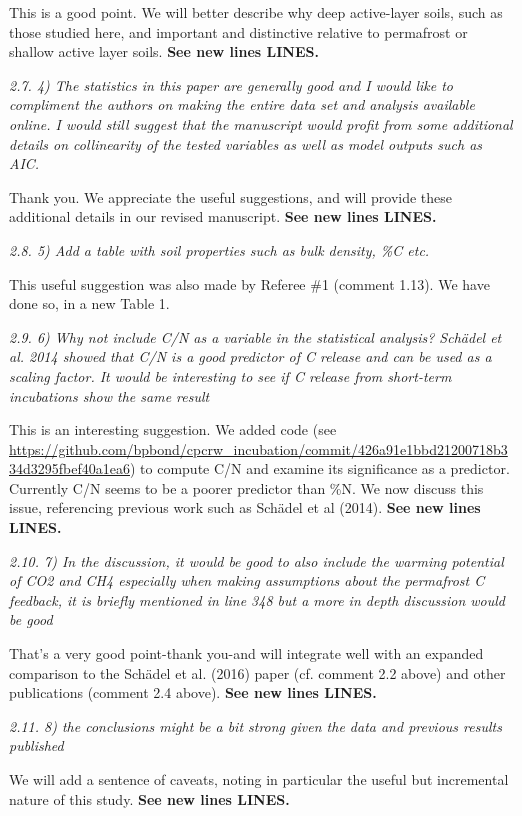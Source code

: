 \documentclass[11pt, oneside]{article}
\begin{document}
This is a good point. We will better describe why deep active-layer soils, such as those studied here, and important and distinctive relative to permafrost or shallow active layer soils.  {\bf See new lines LINES.}

\medskip
{\it 2.7. 4) The statistics in this paper are generally good and I would like to compliment the authors on making the entire data set and analysis available online. I would still suggest that the manuscript would profit from some additional details on collinearity of the tested variables as well as model outputs such as AIC. }

Thank you. We appreciate the useful suggestions, and will provide these additional details in our revised manuscript. {\bf See new lines LINES.}

\medskip
{\it 2.8. 5) Add a table with soil properties such as bulk density, \%C etc. }

This useful suggestion was also made by Referee \#1 (comment 1.13). We have done so, in a new Table 1.

\medskip
{\it 2.9. 6) Why not include C/N as a variable in the statistical analysis? Schädel et al. 2014 showed that C/N is a good predictor of C release and can be used as a scaling factor. It would be interesting to see if C release from short-term incubations show the same result }

This is an interesting suggestion. We added code (see \url{https://github.com/bpbond/cpcrw_incubation/commit/426a91e1bbd21200718b334d3295fbef40a1ea6}) to compute C/N and examine its significance as a predictor. Currently C/N seems to be a poorer predictor than \%N. We now discuss this issue, referencing previous work such as Schädel et al (2014). {\bf See new lines LINES.}

\medskip
{\it 2.10. 7) In the discussion, it would be good to also include the warming potential of CO2 and CH4 especially when making assumptions about the permafrost C feedback, it is briefly mentioned in line 348 but a more in depth discussion would be good }

That's a very good point-thank you-and will integrate well with an expanded comparison to the Schädel et al. (2016) paper (cf. comment 2.2 above) and other publications (comment 2.4 above). {\bf See new lines LINES.}

\medskip
{\it 2.11. 8) the conclusions might be a bit strong given the data and previous results published }

We will add a sentence of caveats, noting in particular the useful but incremental nature of this study. {\bf See new lines LINES.}
\end{document}
